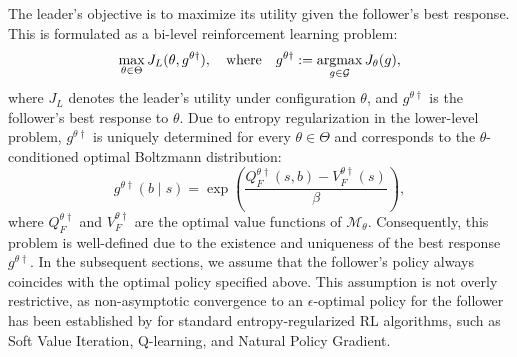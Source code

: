 \documentclass[letterpaper]{article} %
\providecommand{\argmax}{\operatornamewithlimits{argmax}} %
\newtheorem{assumption}{Assumption}
\begin{document}
The leader's objective is to maximize its utility given the follower's best response.
This is formulated as a bi-level reinforcement learning problem:
\begin{equation}
    \max_{{\theta} \in \Theta} J_L({\theta},g^{\theta\dagger}), \quad \text{where} \quad g^{\theta\dagger} := \argmax_{g\in\mathcal{G}} J_{\theta}(g) ,\label{eq:upper}
\end{equation}
where $J_L$ denotes the leader's utility under configuration ${\theta}$, and $g^{\theta\dagger}$ is the follower's best response to ${\theta}$.
Due to entropy regularization in the lower-level problem, $g^{\theta\dagger}$ is uniquely determined for every $\theta\in\Theta$ and corresponds to the $\theta$-conditioned optimal Boltzmann distribution:
\begin{equation*}
    g^{\theta\dagger}(b\mid s)=\exp\left(\dfrac{Q_F^{\theta\dagger}(s,b)-V_F^{\theta\dagger}(s)}{\beta}\right),
\end{equation*}
where $Q_F^{\theta\dagger}$ and $V_F^{\theta\dagger}$ are the optimal value functions of $\mathcal{M}_{\theta}$.
Consequently, this problem is well-defined due to the existence and uniqueness of the best response $g^{{\theta} \dagger}$.
In the subsequent sections, we assume that the follower’s policy always coincides with the optimal policy specified above.
This assumption is not overly restrictive, as non-asymptotic convergence to an $\epsilon$-optimal policy for the follower has been established by \citet{Thoma2024-em} for standard entropy-regularized RL algorithms, such as Soft Value Iteration, Q-learning, and Natural Policy Gradient.
\end{document}
